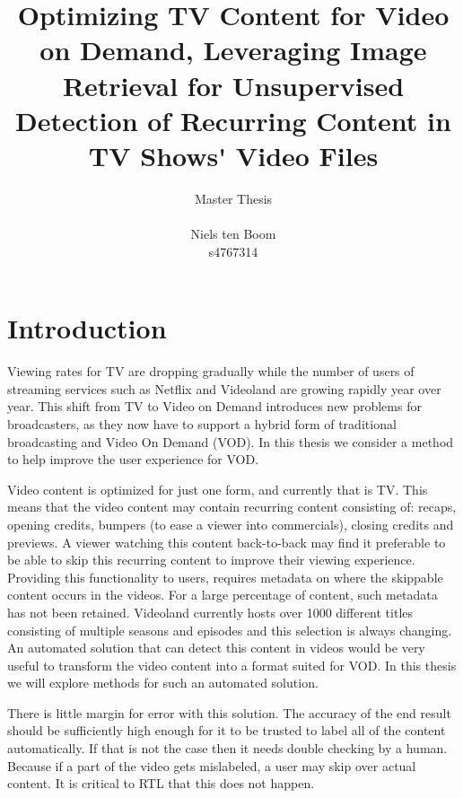 \documentclass{article}
\begin{document}
\title{Optimizing TV Content for Video on Demand, Leveraging Image Retrieval for Unsupervised Detection of Recurring Content in TV Shows\'{} Video Files}
\author{Master Thesis\\ \\ Niels ten Boom  \\ s4767314}

\date{\vspace{-3ex}}

\maketitle
\newpage

\tableofcontents
\newpage

\section{Introduction} \label{introduction}
Viewing rates for TV are dropping gradually while the number of users of streaming services such as Netflix and Videoland are growing rapidly year over year. This shift from TV to Video on Demand introduces new problems for broadcasters, as they now have to support a hybrid form of traditional broadcasting and Video On Demand (VOD). In this thesis we consider a method to help improve the user experience for VOD.

Video content is optimized for just one form, and currently that is TV. This means that the video content may contain recurring content consisting of: recaps, opening credits, bumpers (to ease a viewer into commercials), closing credits and previews. A viewer watching this content back-to-back may find it preferable to be able to skip this recurring content to improve their viewing experience. Providing this functionality to users, requires metadata on where the skippable content occurs in the videos. For a large percentage of content, such metadata has not been retained. Videoland currently hosts over 1000 different titles consisting of multiple seasons and episodes and this selection is always changing. An automated solution that can detect this content in videos would be very useful to transform the video content into a format suited for VOD. In this thesis we will explore methods for such an automated solution.

There is little margin for error with this solution. The accuracy of the end result should be sufficiently high enough for it to be trusted to label all of the content automatically. If that is not the case then it needs double checking by a human. Because if a part of the video gets mislabeled, a user may skip over actual content. It is critical to RTL that this does not happen.
\end{document}
